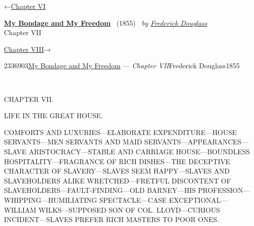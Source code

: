 \hypertarget{headerContainer}{}
\hypertarget{navigationHeader}{}
\protect\hypertarget{headerprevious}{}{←\href{/wiki/My_Bondage_and_My_Freedom_(1855)/Chapter_VI}{Chapter
VI}}

\textbf{\protect\hypertarget{header_title_text}{}{\href{/wiki/My_Bondage_and_My_Freedom_(1855)}{My
Bondage and My Freedom}}} ~(1855)~ \emph{by
\href{/wiki/Author:Frederick_Douglass}{\protect\hypertarget{header_author_text}{}{{Frederick
Douglass}}}}\\
\protect\hypertarget{header_section_text}{}{Chapter VII}

\protect\hypertarget{headernext}{}{\href{/wiki/My_Bondage_and_My_Freedom_(1855)/Chapter_VIII}{Chapter
VIII}→}

\hypertarget{navigationNotes}{}

\hypertarget{ws-data}{}
\protect\hypertarget{ws-article-id}{}{2336903}\protect\hypertarget{ws-title}{}{\href{/wiki/My_Bondage_and_My_Freedom_(1855)}{My
Bondage and My Freedom} --- \emph{Chapter
VII}}\protect\hypertarget{ws-author}{}{Frederick
Douglass}\protect\hypertarget{ws-year}{}{1855}

{\protect\hypertarget{107}{}{}}

~

{CHAPTER VII.}

LIFE IN THE GREAT HOUSE.

{COMFORTS AND LUXURIES---ELABORATE EXPENDITURE---HOUSE SERVANTS---MEN
SERVANTS AND MAID SERVANTS---APPEARANCES---SLAVE ARISTOCRACY---STABLE
AND CARRIAGE HOUSE---BOUNDLESS HOSPITALITY---FRAGRANCE OF RICH
DISHES---THE DECEPTIVE CHARACTER OF SLAVERY---SLAVES SEEM HAPPY---SLAVES
AND SLAVEHOLDERS ALIKE WRETCHED---FRETFUL DISCONTENT OF
SLAVEHOLDERS---FAULT-FINDING---OLD BARNEY---HIS
PROFESSION---WHIPPING---HUMILIATING SPECTACLE---CASE
EXCEPTIONAL---WILLIAM WILKS---SUPPOSED SON OF COL. LLOYD---CURIOUS
INCIDENT---SLAVES PREFER RICH MASTERS TO POOR ONES.}

